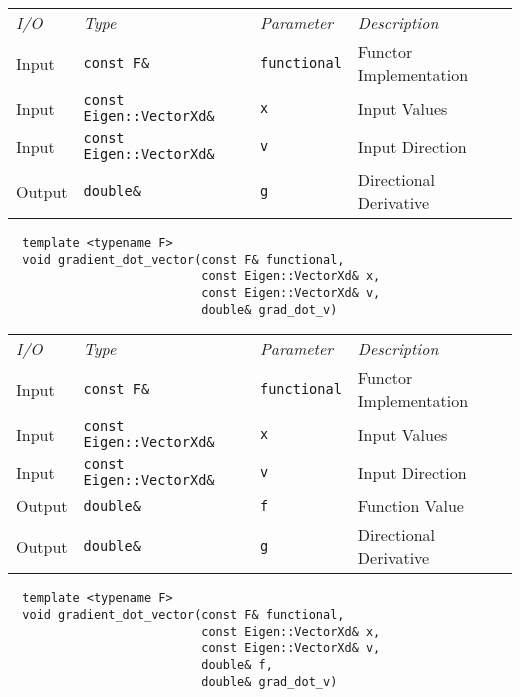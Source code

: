 \begin{tcolorbox}[colback=white,colframe=gray90, coltitle=black,boxrule=3pt,
fonttitle=\bfseries,title=Directional Derivative]

\begin{tabular}{llll}
\textit{I/O} & \textit{Type} & \textit{Parameter} & \textit{Description} \\
Input & \texttt{const F\&} & \texttt{functional} & Functor Implementation \\
Input & \texttt{const Eigen::VectorXd\&} & \texttt{x} & Input Values \\
Input & \texttt{const Eigen::VectorXd\&} & \texttt{v} & Input Direction \\
Output & \texttt{double\&} & \texttt{g} & Directional Derivative
\end{tabular}

\vspace{5mm}

\begin{verbatim}
  template <typename F>
  void gradient_dot_vector(const F& functional,
                           const Eigen::VectorXd& x,
                           const Eigen::VectorXd& v,
                           double& grad_dot_v)
\end{verbatim}

\end{tcolorbox}

\begin{tcolorbox}[colback=white,colframe=gray90, coltitle=black,boxrule=3pt,
fonttitle=\bfseries,title=Directional Derivative]

\begin{tabular}{llll}
\textit{I/O} & \textit{Type} & \textit{Parameter} & \textit{Description} \\
Input & \texttt{const F\&} & \texttt{functional} & Functor Implementation \\
Input & \texttt{const Eigen::VectorXd\&} & \texttt{x} & Input Values \\
Input & \texttt{const Eigen::VectorXd\&} & \texttt{v} & Input Direction \\
Output & \texttt{double\&} & \texttt{f} & Function Value \\
Output & \texttt{double\&} & \texttt{g} & Directional Derivative
\end{tabular}

\vspace{5mm}

\begin{verbatim}
  template <typename F>
  void gradient_dot_vector(const F& functional,
                           const Eigen::VectorXd& x,
                           const Eigen::VectorXd& v,
                           double& f,
                           double& grad_dot_v)
\end{verbatim}

\end{tcolorbox}

